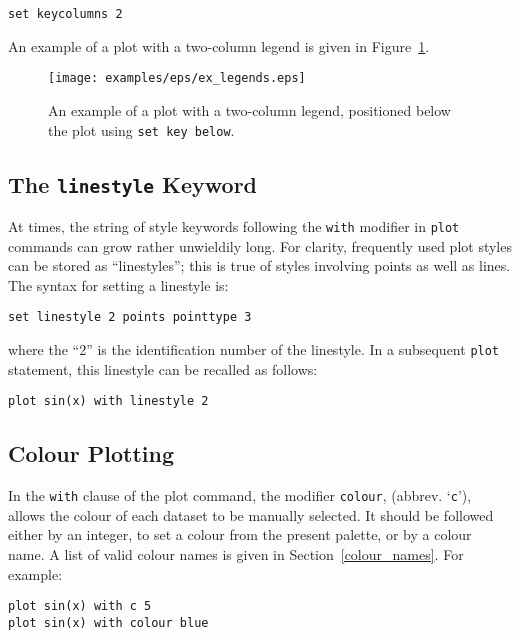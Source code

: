 \documentclass[a4paper,onecolumn,11pt]{book}
\begin{document}
\begin{verbatim}
set keycolumns 2
\end{verbatim}

An example of a plot with a two-column legend is given in Figure~\ref{fig:ex_legends}.

\begin{figure}
\begin{center}
\texttt{[image: examples/eps/ex\_legends.eps]}
\end{center}
\caption{An example of a plot with a two-column legend, positioned below the plot using {\tt set key below}.}
\label{fig:ex_legends}
\end{figure}

\subsection{The \texttt{linestyle} Keyword}

At times, the string of style keywords following the \texttt{with} modifier in
\texttt{plot} commands can grow rather unwieldily long. For clarity, frequently
used plot styles can be stored as ``linestyles''; this is true of styles
involving points as well as lines. The syntax for setting a linestyle is:

\begin{verbatim}
set linestyle 2 points pointtype 3
\end{verbatim}

\noindent where the ``2'' is the identification number of the linestyle. In a
subsequent \texttt{plot} statement, this linestyle can be recalled as follows:

\begin{verbatim}
plot sin(x) with linestyle 2
\end{verbatim}

\subsection{Colour Plotting}

 In the \texttt{with}
clause of the plot command, the modifier \texttt{colour}, (abbrev.
`\texttt{c}'), allows the colour of each dataset to be manually selected. It
should be followed either by an integer, to set a colour from the present
palette, or by a colour name. A list of valid colour names is given in
Section~\ref{colour_names}. For example:

\begin{verbatim}
plot sin(x) with c 5
plot sin(x) with colour blue
\end{verbatim}
\end{document}
